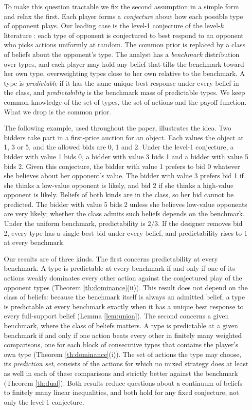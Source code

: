 \documentclass[12pt]{article}
\theoremstyle{definition}
\begin{document}
To make this question tractable we fix the second assumption in a simple form and relax the first. Each player forms a \emph{conjecture} about how each possible type of opponent plays. Our leading case is the level-1 conjecture of the level-$k$ literature \citep{nagel1995, stahl1995, crawford2007levelk}: each type of opponent is conjectured to best respond to an opponent who picks actions uniformly at random. The common prior is replaced by a class of beliefs about the opponent's type. The analyst has a \emph{benchmark} distribution over types, and each player may hold any belief that tilts the benchmark toward her own type, overweighting types close to her own relative to the benchmark. A type is \emph{predictable} if it has the same unique best response under every belief in the class, and \emph{predictability} is the benchmark mass of predictable types. We keep common knowledge of the set of types, the set of actions and the payoff function. What we drop is the common prior.

The following example, used throughout the paper, illustrates the idea. Two bidders take part in a first-price auction for an object. Each values the object at 1, 3 or 5, and the allowed bids are 0, 1 and 2. Under the level-1 conjecture, a bidder with value 1 bids 0, a bidder with value 3 bids 1 and a bidder with value 5 bids 2. Given this conjecture, the bidder with value 1 prefers to bid 0 whatever she believes about her opponent's value. The bidder with value 3 prefers bid 1 if she thinks a low-value opponent is likely, and bid 2 if she thinks a high-value opponent is likely. Beliefs of both kinds are in the class, so her bid cannot be predicted. The bidder with value 5 bids 2 unless she believes low-value opponents are very likely; whether the class admits such beliefs depends on the benchmark. Under the uniform benchmark, predictability is $2/3$. If the designer removes bid 2, every type has a single best bid under every belief, and predictability rises to 1 at every benchmark.

Our results are of three kinds. The first concerns predictability at every benchmark. A type is predictable at every benchmark if and only if one of its actions weakly dominates every other action against the conjectured play of the opponent types (Theorem \ref{th:dominance}(ii)). This result does not depend on the class of beliefs: because the benchmark itself is always an admitted belief, a type is predictable at every benchmark exactly when it has a unique best response to every full-support belief (Lemma \ref{lem:union}). The second concerns a given benchmark, where the class of beliefs matters. A type is predictable at a given benchmark if and only if one action beats every other in finitely many weighted comparisons, one for each block of consecutive types that contains the player's own type (Theorem \ref{th:dominance}(i)). The set of actions the type may choose, its \emph{prediction set}, consists of the actions for which no mixed strategy does at least as well in each of these comparisons and strictly better against the benchmark (Theorem \ref{th:dual}). Both results reduce questions about a continuum of beliefs to finitely many linear inequalities, and both hold for any fixed conjecture, not only the level-1 conjecture.
\end{document}
